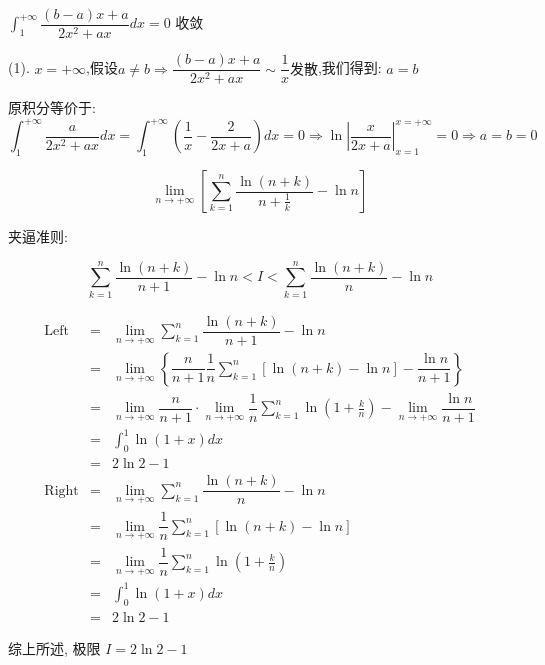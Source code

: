 \begin{solution}

	$\displaystyle{\int_{1}^{+\infty}\dfrac{(b-a)x+a}{2x^2+ax}dx=0}$ 收敛
	
	(1). $x=+\infty$,假设$a\neq b\Rightarrow \dfrac{(b-a)x+a}{2x^2+ax}\sim \dfrac{1}{x}\text{发散}$,我们得到:  $a=b$
	
	原积分等价于:  $$\int_{1}^{+\infty}\dfrac{a}{2x^2+ax}dx=\int_{1}^{+\infty}(\dfrac{1}{x}-\dfrac{2}{2x+a})dx=0\Rightarrow \ln|\dfrac{x}{2x+a}|_{x=1}^{x=+\infty}=0\Rightarrow a=b=0$$
\end{solution}

\begin{example}[][Exam: 36.2.14]
	$$\lim\limits_{n\to +\infty}\left[\sum\limits_{k=1}^{n}\dfrac{\ln(n+k)}{n+\frac{1}{k}}-\ln n\right]$$
\end{example}

\begin{solution}

	夹逼准则:

	$$\sum\limits_{k=1}^{n}\dfrac{\ln(n+k)}{n+1}-\ln n<I<\sum\limits_{k=1}^{n}\dfrac{\ln(n+k)}{n}-\ln n$$

	\begin{eqnarray*}
		\text{Left}  & = & \lim\limits_{n\to +\infty}\sum\limits_{k=1}^{n}\dfrac{\ln(n+k)}{n+1}-\ln n\\
		             & = & \lim\limits_{n\to +\infty}\left\lbrace \dfrac{n}{n+1}\dfrac{1}{n}\sum\limits_{k=1}^{n}[\ln(n+k)-\ln n]-\dfrac{\ln n}{n+1}\right\rbrace \\
					 & = & \lim\limits_{n\to +\infty}\dfrac{n}{n+1}\cdot\lim\limits_{n\to +\infty}\dfrac{1}{n}\sum\limits_{k=1}^{n}\ln(1+\frac{k}{n})-
					 \lim\limits_{n\to +\infty}\dfrac{\ln n}{n+1}\\
		             & = & \int_{0}^{1}\ln(1+x)dx\\
		             & = & 2\ln2-1\\
		\text{Right} & = & \lim\limits_{n\to +\infty}\sum\limits_{k=1}^{n}\dfrac{\ln(n+k)}{n}-\ln n\\
		             & = & \lim\limits_{n\to +\infty}\dfrac{1}{n}\sum\limits_{k=1}^{n}[\ln(n+k)-\ln n]\\
		             & = & \lim\limits_{n\to +\infty}\dfrac{1}{n}\sum\limits_{k=1}^{n}\ln(1+\frac{k}{n})\\
		             & = & \int_{0}^{1}\ln(1+x)dx\\
		             & = & 2\ln2-1
	\end{eqnarray*}
	
	综上所述, 极限 $I=2\ln2-1$
\end{solution}


